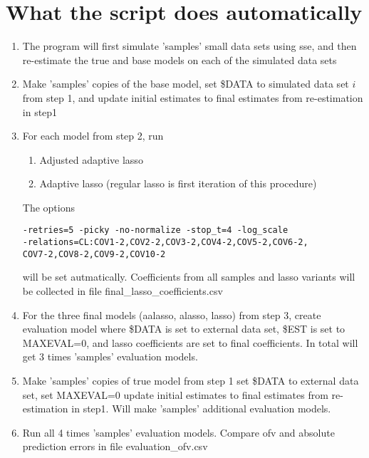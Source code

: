 \section{What the script does automatically}
\begin{enumerate}
\item The program will first simulate 'samples' small data sets using sse,
and then re-estimate the true and base models on each of the simulated data sets
\item Make 'samples' copies of the base model, set \$DATA to simulated 
data set $i$ from step 1, and update initial estimates to final estimates 
from re-estimation in step1
\item For each model from step 2, run
\begin{enumerate}
\item Adjusted adaptive lasso
\item Adaptive lasso (regular lasso is first iteration of this procedure)
\end{enumerate}
The options 
\begin{verbatim}
-retries=5 -picky -no-normalize -stop_t=4 -log_scale 
-relations=CL:COV1-2,COV2-2,COV3-2,COV4-2,COV5-2,COV6-2,
COV7-2,COV8-2,COV9-2,COV10-2
\end{verbatim}
will be set autmatically.
Coefficients from all samples and lasso variants will be collected in 
file final\_lasso\_coefficients.csv
\item For the three final models (aalasso, alasso, lasso) from step 3, create
evaluation model where \$DATA is set to external data set, \$EST is set to
MAXEVAL=0, and lasso coefficients are set to final coefficients. 
In total will get 3 times 'samples' evaluation models.
\item Make 'samples' copies of true model from step 1
set \$DATA to external data set, set MAXEVAL=0
update initial estimates to final estimates 
from re-estimation in step1. Will make 'samples' additional evaluation models.
\item Run all 4 times 'samples' evaluation models. Compare ofv and absolute 
prediction errors in file evaluation\_ofv.csv
\end{enumerate}


